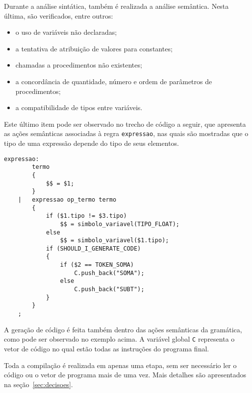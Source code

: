 Durante a análise sintática, também é realizada a análise semântica. Nesta
última, são verificados, entre outros:
\begin{itemize}
	\item o uso de variáveis não declaradas;
	\item a tentativa de atribuição de valores para constantes;
	\item chamadas a procedimentos não existentes;
	\item a concordância de quantidade, número e ordem de parâmetros de
	procedimentos;
	\item a compatibilidade de tipos entre variáveis.
\end{itemize}

Este último item pode ser observado no trecho de código a seguir, que apresenta
as ações semânticas associadas à regra \texttt{expressao}, nas quais são
mostradas que o tipo de uma expressão depende do tipo de seus elementos.

\begin{verbatim}
expressao:
        termo
        {
            $$ = $1;
        }
    |   expressao op_termo termo 
        {
            if ($1.tipo != $3.tipo)
                $$ = simbolo_variavel(TIPO_FLOAT);
            else
                $$ = simbolo_variavel($1.tipo);
            if (SHOULD_I_GENERATE_CODE)
            {
                if ($2 == TOKEN_SOMA)
                    C.push_back("SOMA");
                else
                    C.push_back("SUBT");
            }
        }
    ;
\end{verbatim}

A geração de código é feita também dentro das ações semânticas da gramática,
como pode ser observado no exemplo acima. A variável global \texttt{C}
representa o vetor de código no qual estão todas as instruções do programa
final.

Toda a compilação é realizada em apenas uma etapa, sem ser necessário ler o
código ou o vetor de programa mais de uma vez. Mais detalhes são apresentados
na seção~\ref{sec:decisoes}.

